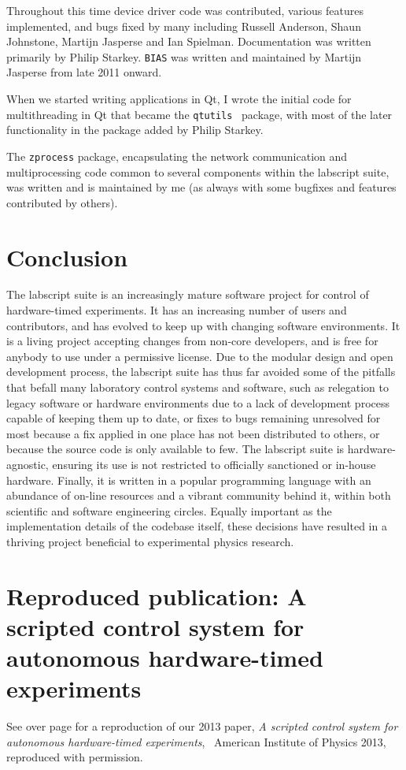 Throughout this time device driver code was contributed, various features implemented, and bugs fixed by many including Russell Anderson, Shaun Johnstone, Martijn Jasperse and Ian Spielman. Documentation was written primarily by Philip Starkey. \texttt{BIAS} was written and maintained by Martijn Jasperse from late 2011 onward.

When we started writing applications in Qt, I wrote the initial code for multithreading in Qt that became the \texttt{qtutils}~\cite{starkey_qtutils_2018} package, with most of the later functionality in the package added by Philip Starkey.

The \texttt{zprocess} package, encapsulating the network communication and multiprocessing code common to several components within the labscript suite, was written and is maintained by me (as always with some bugfixes and features contributed by others).

\section{Conclusion}

The labscript suite is an increasingly mature software project for control of hardware-timed experiments. It has an increasing number of users and contributors, and has evolved to keep up with changing software environments. It is a living project accepting changes from non-core developers, and is free for anybody to use under a permissive license. Due to the modular design and open development process, the labscript suite has thus far avoided some of the pitfalls that befall many laboratory control systems and software, such as relegation to legacy software or hardware environments due to a lack of development process capable of keeping them up to date, or fixes to bugs remaining unresolved for most because a fix applied in one place has not been distributed to others, or because the source code is only available to few. The labscript suite is hardware-agnostic, ensuring its use is not restricted to officially sanctioned or in-house hardware. Finally, it is written in a popular programming language with an abundance of on-line resources and a vibrant community behind it, within both scientific and software engineering circles. Equally important as the implementation details of the codebase itself, these decisions have resulted in a thriving project beneficial to experimental physics research.

\section{Reproduced publication: A scripted control system for autonomous hardware-timed experiments}

See over page for a reproduction of our 2013 paper, \emph{A scripted control system for autonomous hardware-timed experiments}, \textcopyright\ American Institute of Physics 2013, reproduced with permission.



